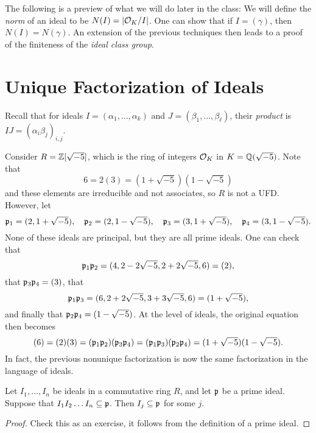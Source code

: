 \begin{remark}
  The following is a preview of what we will do
  later in the class: We will define the
  \emph{norm} of an ideal to be $N(I) = |\mathcal{O}_K / I|$.
  One can show that if $I = (\gamma)$, then
  $N(I) = N(\gamma)$. An extension of the previous
  techniques then leads to a proof of the finiteness
  of the \emph{ideal class group}.
\end{remark}

\section{Unique Factorization of Ideals}

\begin{remark}
  Recall that for ideals $I = (\alpha_1, \dots, \alpha_k)$
  and $J = (\beta_1, \dots, \beta_\ell)$, their
  \emph{product} is
  $IJ = (\alpha_i \beta_j)_{i, j}$.
\end{remark}

\begin{example}
  Consider $R = \mathbb{Z}[\sqrt{-5}]$, which is the
  ring of integers $\mathcal{O}_K$ in $K = \mathbb{Q}(\sqrt{-5})$.
  Note that
  \[
    6 = 2(3) = (1 + \sqrt{-5})(1 - \sqrt{-5})
  \]
  and these elements are irreducible and not associates,
  so $R$ is not a UFD. However, let
  \[
    \mathfrak{p}_1 = (2, 1 + \sqrt{-5}),
    \quad \mathfrak{p}_2 = (2, 1 - \sqrt{-5}),
    \quad \mathfrak{p}_3 = (3, 1 + \sqrt{-5}),
    \quad \mathfrak{p}_4 = (3, 1 - \sqrt{-5}).
  \]
  None of these ideals are principal, but they are
  all prime ideals. One can check that
  \[
    \mathfrak{p}_1 \mathfrak{p}_2 = (4, 2 - 2\sqrt{-5}, 2 + 2 \sqrt{-5}, 6) = (2),
  \]
  that
  $\mathfrak{p}_3 \mathfrak{p}_4 = (3)$, that
  \[
    \mathfrak{p}_1 \mathfrak{p}_3 = (6, 2 + 2 \sqrt{-5}, 3 + 3\sqrt{-5}, 6)
    = (1 + \sqrt{-5}),
  \]
  and finally that $\mathfrak{p}_2 \mathfrak{p}_4 = (1 - \sqrt{-5})$. At
  the level of ideals, the original equation then becomes
  \[
    (6) = (2)(3) = (\mathfrak{p}_1 \mathfrak{p}_2) (\mathfrak{p}_3 \mathfrak{p}_4)
    = (\mathfrak{p}_1 \mathfrak{p}_3) (\mathfrak{p}_2 \mathfrak{p}_4)
    = (1 + \sqrt{-5})(1 - \sqrt{-5}).
  \]
  In fact, the previous nonunique factorization is
  now the same factorization in the language of ideals.
\end{example}

\begin{lemma}
  Let $I_1, \dots, I_n$ be ideals in a commutative
  ring $R$, and let $\mathfrak{p}$ be a prime ideal. Suppose that
  $I_1 I_2 \dots I_n \subseteq \mathfrak{p}$. Then
  $I_j \subseteq \mathfrak{p}$ for some $j$.
\end{lemma}

\begin{proof}
  Check this as an exercise, it follows from the
  definition of a prime ideal.
\end{proof}

